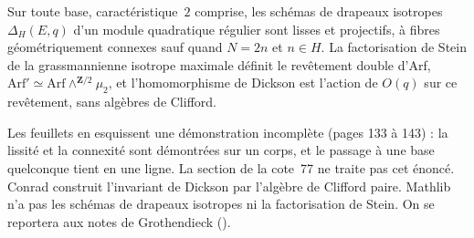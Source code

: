 \begin{encadre}
\begin{theoreme*}\nonverifie
Sur toute base, caractéristique~$2$ comprise, les schémas de drapeaux isotropes $\Delta_H(E, q)$ d'un module quadratique régulier sont lisses et projectifs, à fibres géométriquement connexes sauf quand $N = 2n$ et $n \in H$. La factorisation de Stein de la grassmannienne isotrope maximale définit le revêtement double d'Arf, $\mathrm{Arf}' \simeq \mathrm{Arf} \wedge^{\mathbf Z/2} \mu_2$, et l'homomorphisme de Dickson est l'action de $O(q)$ sur ce revêtement, sans algèbres de Clifford.
\end{theoreme*}
\end{encadre}
{\small Les feuillets en esquissent une démonstration incomplète (pages 133 à 143) : la lissité et la connexité sont démontrées sur un corps, et le passage à une base quelconque  tient en une ligne. La section de la cote~77 ne traite pas cet énoncé. Conrad construit l'invariant de Dickson par l'algèbre de Clifford paire. Mathlib n'a pas les schémas de drapeaux isotropes ni la factorisation de Stein. On se reportera aux notes de Grothendieck ().\par}
